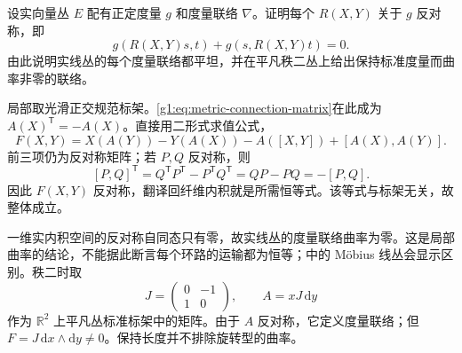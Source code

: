 \begin{exercise}\label{g1:ex:metric-curvature-skew}
	设实向量丛 \(E\) 配有正定度量 \(g\) 和度量联络 \(\nabla\)。证明每个 \(R(X,Y)\) 关于 \(g\) 反对称，即
	\[
		g(R(X,Y)s,t)+g(s,R(X,Y)t)=0.
	\]
	由此说明实线丛的每个度量联络都平坦，并在平凡秩二丛上给出保持标准度量而曲率非零的联络。
\end{exercise}
\begin{solution}
	局部取光滑正交规范标架。\eqref{g1:eq:metric-connection-matrix}在此成为 \(A(X)^{\mathsf T}=-A(X)\)。直接用二形式求值公式，
	\[
		F(X,Y)=X(A(Y))-Y(A(X))-A([X,Y])+[A(X),A(Y)].
	\]
	前三项仍为反对称矩阵；若 \(P,Q\) 反对称，则
	\[
		[P,Q]^{\mathsf T}=Q^{\mathsf T}P^{\mathsf T}-P^{\mathsf T}Q^{\mathsf T}
		=QP-PQ=-[P,Q].
	\]
	因此 \(F(X,Y)\) 反对称，翻译回纤维内积就是所需恒等式。该等式与标架无关，故整体成立。

	一维实内积空间的反对称自同态只有零，故实线丛的度量联络曲率为零。这是局部曲率的结论，不能据此断言每个环路的运输都为恒等；中的 Möbius 线丛会显示区别。秩二时取
	\[
		J=\begin{pmatrix}0&-1\\1&0\end{pmatrix},\qquad A=xJ\,\mathrm{d}y
	\]
	作为 \(\mathbb R^2\) 上平凡丛标准标架中的矩阵。由于 \(A\) 反对称，它定义度量联络；但 \(F=J\,\mathrm{d}x\wedge\mathrm{d}y\ne0\)。保持长度并不排除旋转型的曲率。
\end{solution}

